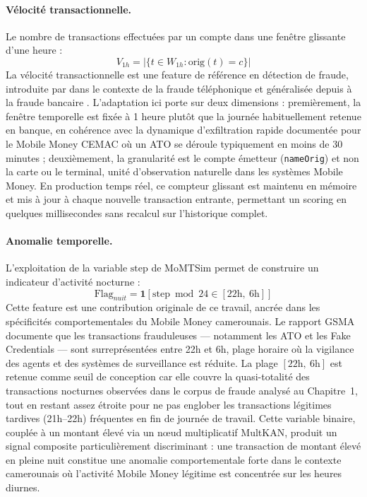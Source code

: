\documentclass[11pt,a4paper,oneside]{report}
\theoremstyle{definition}
\theoremstyle{remark}
\begin{document}
\paragraph{Vélocité transactionnelle.}
Le nombre de transactions effectuées par un compte dans une fenêtre glissante d'une heure :
\begin{equation}
    V_{1h} = \left|\{t \in W_{1h} : \text{orig}(t) = c\}\right|
\end{equation}
La vélocité transactionnelle est une feature de référence en détection de fraude, introduite par \citet{fawcett1997adaptive} dans le contexte de la fraude téléphonique et généralisée depuis à la fraude bancaire \citep{bolton2002statistical}. L'adaptation ici porte sur deux dimensions : premièrement, la fenêtre temporelle est fixée à 1 heure plutôt que la journée habituellement retenue en banque, en cohérence avec la dynamique d'exfiltration rapide documentée pour le Mobile Money CEMAC \citep{gsma2024fraud} où un ATO se déroule typiquement en moins de 30 minutes ; deuxièmement, la granularité est le compte émetteur (\texttt{nameOrig}) et non la carte ou le terminal, unité d'observation naturelle dans les systèmes Mobile Money. En production temps réel, ce compteur glissant est maintenu en mémoire et mis à jour à chaque nouvelle transaction entrante, permettant un scoring en quelques millisecondes sans recalcul sur l'historique complet.

\paragraph{Anomalie temporelle.}
L'exploitation de la variable $\text{step}$ de MoMTSim permet de construire un indicateur d'activité nocturne :
\begin{equation}
    \text{Flag}_{nuit} = \mathbf{1}\left[\text{step} \bmod 24 \in [22\text{h},\ 6\text{h}]\right]
\end{equation}
Cette feature est une contribution originale de ce travail, ancrée dans les spécificités comportementales du Mobile Money camerounais. Le rapport GSMA \citet{gsma2024fraud} documente que les transactions frauduleuses — notamment les ATO et les Fake Credentials — sont surreprésentées entre 22h et 6h, plage horaire où la vigilance des agents et des systèmes de surveillance est réduite. La plage $[22\text{h},\ 6\text{h}]$ est retenue comme seuil de conception car elle couvre la quasi-totalité des transactions nocturnes observées dans le corpus de fraude analysé au Chapitre~1, tout en restant assez étroite pour ne pas englober les transactions légitimes tardives (21h--22h) fréquentes en fin de journée de travail. Cette variable binaire, couplée à un montant élevé via un nœud multiplicatif MultKAN, produit un signal composite particulièrement discriminant : une transaction de montant élevé en pleine nuit constitue une anomalie comportementale forte dans le contexte camerounais où l'activité Mobile Money légitime est concentrée sur les heures diurnes.
\end{document}
